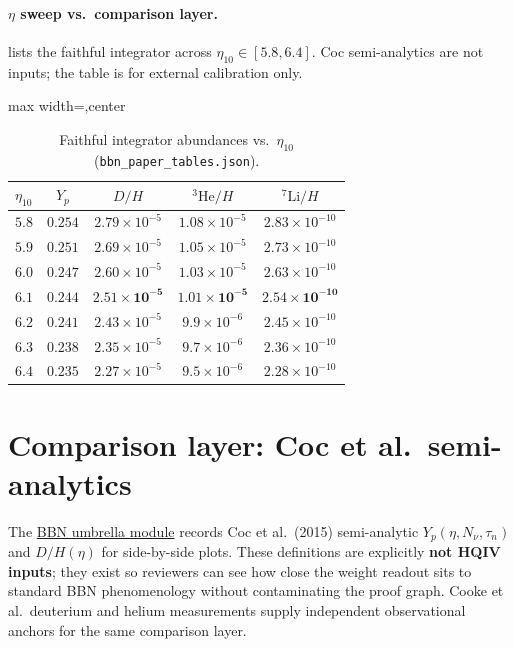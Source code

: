 \documentclass[11pt]{amsart}
\newcommand{\fitbox}[1]{\begin{adjustbox}{max width=\linewidth,center}#1\end{adjustbox}}
\begin{document}
\paragraph{$\eta$ sweep vs.\ comparison layer.}
 lists the faithful integrator across
$\eta_{10}\in[5.8,6.4]$.  Coc semi-analytics \cite{coc2015} are not inputs;
the table is for external calibration only.

\begin{table}[ht]
\centering
\caption{Faithful integrator abundances vs.\ $\eta_{10}$
(\texttt{bbn\_paper\_tables.json}).}
\label{tab:eta-sweep}
\fitbox{%
\small
\setlength{\tabcolsep}{3pt}
\begin{tabular}{@{}lcccc@{}}
\toprule
$\eta_{10}$ & $Y_p$ & $D/H$ & $^3\mathrm{He}/H$ & $^7\mathrm{Li}/H$ \\
\midrule
$5.8$ & $0.254$ & $2.79\times10^{-5}$ & $1.08\times10^{-5}$ & $2.83\times10^{-10}$ \\
$5.9$ & $0.251$ & $2.69\times10^{-5}$ & $1.05\times10^{-5}$ & $2.73\times10^{-10}$ \\
$6.0$ & $0.247$ & $2.60\times10^{-5}$ & $1.03\times10^{-5}$ & $2.63\times10^{-10}$ \\
$\mathbf{6.1}$ & $\mathbf{0.244}$ & $\mathbf{2.51\times10^{-5}}$ & $\mathbf{1.01\times10^{-5}}$ & $\mathbf{2.54\times10^{-10}}$ \\
$6.2$ & $0.241$ & $2.43\times10^{-5}$ & $9.9\times10^{-6}$ & $2.45\times10^{-10}$ \\
$6.3$ & $0.238$ & $2.35\times10^{-5}$ & $9.7\times10^{-6}$ & $2.36\times10^{-10}$ \\
$6.4$ & $0.235$ & $2.27\times10^{-5}$ & $9.5\times10^{-6}$ & $2.28\times10^{-10}$ \\
\bottomrule
\end{tabular}}
\end{table}

\section{Comparison layer: Coc et al.\ semi-analytics}
\label{sec:comparison}

The \hyperref[lean:bbn-umbrella]{BBN umbrella module} records Coc et al.\
(2015) semi-analytic $Y_p(\eta,N_\nu,\tau_n)$ and $D/H(\eta)$ for
side-by-side plots. These definitions are explicitly \textbf{not HQIV
inputs}; they exist so reviewers can see how close the weight readout sits
to standard BBN phenomenology without contaminating the proof graph.
Cooke et al.\ deuterium and helium measurements \cite{cooke2014,cooke2018}
supply independent observational anchors for the same comparison layer.
\end{document}

